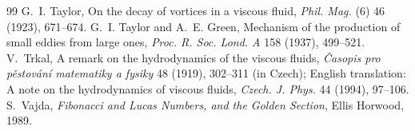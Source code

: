 \documentclass[11pt]{article}
\begin{document}
\begin{thebibliography}{99}
 G.~I. Taylor, On the decay of vortices in a viscous fluid, \emph{Phil. Mag.} (6) 46 (1923), 671--674.
 G.~I. Taylor and A.~E. Green, Mechanism of the production of small eddies from large ones, \emph{Proc. R. Soc. Lond. A} 158 (1937), 499--521.
 V.~Trkal, A remark on the hydrodynamics of the viscous fluids, \emph{\v{C}asopis pro p\v{e}stov\'an\'i matematiky a fysiky} 48 (1919), 302--311 (in Czech); English translation: A note on the hydrodynamics of viscous fluids, \emph{Czech. J. Phys.} 44 (1994), 97--106.
 S.~Vajda, \emph{Fibonacci and Lucas Numbers, and the Golden Section}, Ellis Horwood, 1989.
\end{thebibliography}
\end{document}
